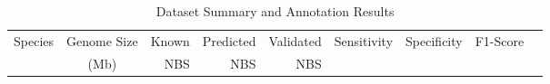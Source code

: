 \begin{table}[htbp]
\centering
\caption{Dataset Summary and Annotation Results}
\label{tab:dataset_summary}
\begin{tabular}{lcrrrrrrr}
\hline
Species & Genome Size & Known & Predicted & Validated & Sensitivity & Specificity & F1-Score \\
        & (Mb)        & NBS   & NBS       & NBS       &             &             &          \\
\hline
\hline
\end{tabular}
\end{table}
